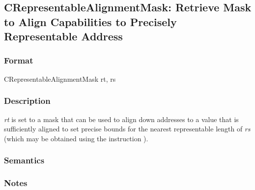 \clearpage
{}
{}
\subsection*{CRepresentableAlignmentMask: Retrieve Mask to Align Capabilities to Precisely Representable Address}

\subsubsection*{Format}

CRepresentableAlignmentMask rt, rs

\begin{center}
\end{center}

\subsubsection*{Description}

\emph{rt} is set to a mask that can be used to align down addresses to a value that is sufficiently aligned to set precise bounds for the nearest representable length of \emph{rs} (which may be obtained using the instruction ).

\subsubsection*{Semantics}


\subsubsection*{Notes}

